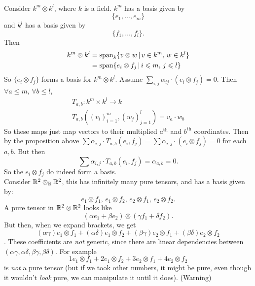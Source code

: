 \documentclass{article}
\begin{document}
\ex \hspace{0.1cm} \\ Consider $k^{m} \otimes k^{l}$, where $k$ is a field. $k^{m}$ has a basis given by \[ \{e_{1}, \dots, e_{m} \} \] and $k^{l}$ has a basis given by \[ \{ f_{1}, \dots, f_{l} \}. \] Then \begin{align*}k^{m} \otimes k^{l} &= \operatorname{span}_{k}\{v \otimes w \, | \, v \in k^{m}, \, w \in k^{l}\}\\
    &= \operatorname{span} \{ e_{i} \otimes f_{j} \, | \, i \leqslant m, \, j \leqslant l \} \end{align*}
    So $\{e_{i} \otimes f_{j}\}$ forms a basis for $k^{m} \otimes k^{l}$.
    \proof Assume $\sum_{i,j} \alpha_{ij} \cdot (e_{i} \otimes f_{j})=0$. Then $\forall a \leq m, \, \forall b \leq l$,
    \begin{align*}
        T_{a,b} : k^{m} \times k^{l} \to k\\
        T_{a,b}((v_{i})_{i=1}^{m},(w_{j})_{j=1}^{l}) = v_{a} \cdot w_{b} \tag{$k$-bilinear}
    \end{align*}
    So these maps just map vectors to their multiplied $a^{\text{th}}$ and $b^{\text{th}}$ coordinates. Then by the proposition above $\sum \alpha_{i,j} \cdot T_{a,b}(e_{i},f_{j})= \sum \alpha_{i,j} \cdot (e_{i} \otimes f_{j}) = 0$ for each $a,b$. But then \[ \sum \alpha_{i,j} \cdot T_{a,b}(e_{i},f_{j})= \alpha_{a,b} = 0. \] So the $e_{i} \otimes f_{j}$ do indeed form a basis.
    \endproof
    \ex \hspace{0.1cm}\\
    Consider $\mathbb{R}^{2} \otimes_{\mathbb{R}} \mathbb{R}^{2}$, this has infinitely many pure tensors, and has a basis given by: \[ e_{1} \otimes f_{1}, \, e_{1} \otimes f_{2}, \, e_{2} \otimes f_{1}, \, e_{2} \otimes f_{2}. \]
    A pure tensor in $\mathbb{R}^{2} \otimes \mathbb{R}^{2}$ looks like \[ (\alpha e_{1} + \beta e_{2}) \otimes (\gamma f_{1} + \delta f_{2}). \] But then, when we expand brackets, we get \[ (\alpha \gamma) e_{1} \otimes f_{1} + (\alpha \delta) e_{1} \otimes f_{2} + (\beta \gamma) e_{2} \otimes f_{1} + (\beta \delta) e_{2} \otimes f_{2}\].
    These coefficients are \textit{not} generic, since there are linear dependencies between $(\alpha \gamma, \alpha \delta, \beta \gamma, \beta \delta)$. For example\[ 1 e_{1} \otimes f_{1} + 2 e_{1} \otimes f_{2} + 3 e_{2} \otimes f_{1} + 4 e_{2} \otimes f_{2}\] is \textit{not} a pure tensor (but if we took other numbers, it might be pure, even though it wouldn't \textit{look} pure, we can manipulate it until it does).
    \ex (Warning)\\
\end{document}
